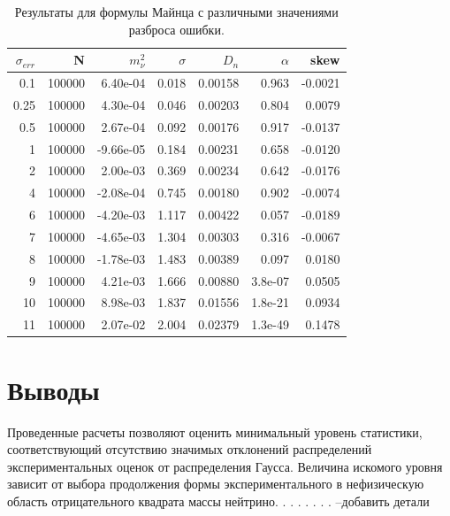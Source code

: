 ﻿\documentclass[a4paper,14pt]{extarticle}
\begin{document}
    \begin{table}
	    \begin{center}
	      \caption{Результаты для формулы Майнца с различными значениями разброса ошибки.}
		    \begin{tabular}{|r|r|r|r|r|r|r|}
		    	\hline
		      $\sigma_{err}$ & N & $m^2_\nu$ & $\sigma$ & $D_n$ & $\alpha$ & skew \\
		      \hline
		      0.1 & 100000 & 6.40e-04 & 0.018 & 0.00158 & 0.963 & -0.0021 \\
		      \hline
		      0.25 & 100000 & 4.30e-04 & 0.046 & 0.00203 & 0.804 & 0.0079 \\
		      \hline
		      0.5 & 100000 & 2.67e-04 & 0.092 & 0.00176 & 0.917 & -0.0137 \\
		      \hline
		      1 & 100000 & -9.66e-05 & 0.184 & 0.00231 & 0.658 & -0.0120 \\
		      \hline
		      2 & 100000 & 2.00e-03 & 0.369 & 0.00234 & 0.642 & -0.0176 \\
		      \hline
		      4 & 100000 & -2.08e-04 & 0.745 & 0.00180 & 0.902 & -0.0074 \\
		      \hline
		      6 & 100000 & -4.20e-03 & 1.117 & 0.00422 & 0.057 & -0.0189 \\
		      \hline
		      7 & 100000 & -4.65e-03 & 1.304 & 0.00303 & 0.316 & -0.0067 \\
		      \hline
		      8 & 100000 & -1.78e-03 & 1.483 & 0.00389 & 0.097 & 0.0180 \\
		      \hline
		      9 & 100000 & 4.21e-03 & 1.666 & 0.00880 & 3.8e-07 & 0.0505 \\
		      \hline
		      10 & 100000 & 8.98e-03 & 1.837 & 0.01556 & 1.8e-21 & 0.0934 \\
		      \hline
		      11 & 100000 & 2.07e-02 & 2.004 & 0.02379 & 1.3e-49 & 0.1478 \\
			      \hline
		    \end{tabular}
	    \end{center}
    \end{table}

    
    
    


    \newpage
    \section{Выводы}
    Проведенные расчеты позволяют оценить минимальный уровень статистики, соответствующий отсутствию
    значимых отклонений распределений экспериментальных оценок от распределения Гаусса. Величина искомого
    уровня зависит от выбора продолжения формы экспериментального в нефизическую область отрицательного
    квадрата массы нейтрино.
    . . . . . . . –добавить детали 
    
\end{document}
